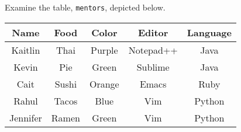 Examine the table, \texttt{mentors}, depicted below.

\begin{center}
\begin{tabular}{|c|c|c|c|c|}
 \hline
 \textbf{Name} & \textbf{Food} & \textbf{Color} & \textbf{Editor} & \textbf{Language} \\
 \hline
 Kaitlin & Thai & Purple & Notepad++ & Java \\
 \hline
 Kevin & Pie & Green & Sublime & Java \\
 \hline
 Cait & Sushi & Orange & Emacs & Ruby \\
 \hline
 Rahul & Tacos & Blue & Vim & Python \\
 \hline
 Jennifer & Ramen & Green & Vim & Python \\
 \hline
\end{tabular}
\end{center}
